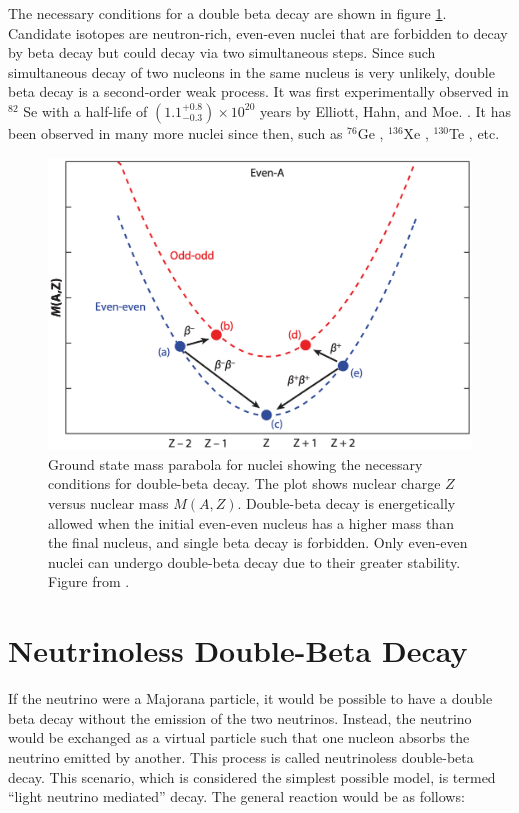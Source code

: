 

The necessary conditions for a double beta decay are shown in figure \ref{2nbb_cond}. Candidate isotopes are neutron-rich, even-even nuclei that are forbidden to decay by beta decay but could decay via two simultaneous steps. Since such simultaneous decay of two nucleons in the same nucleus is very unlikely, double beta decay is a second-order weak process. It was first experimentally observed in $^{82}$ Se with a half-life of $(1.1^{+0.8}_{-0.3})\times 10^{20}$ years by Elliott, Hahn, and Moe. \cite{PhysRevLett.59.2020}. It has been observed in many more nuclei since then, such as $^{76}$Ge \cite{PhysRevLett.125.252502}, $^{136}$Xe \cite{PhysRevLett.107.212501}, $^{130}$Te \cite{Alduino2017}, etc.

\clearpage
\begin{figure}[!htb]
\centering
\includegraphics[width=0.85\linewidth]{ch1/figs/2nbb_cond.png}
\caption{Ground state mass parabola for nuclei showing the necessary conditions for double-beta decay. The plot shows nuclear charge $Z$ versus nuclear mass $M(A,Z)$. Double-beta decay is energetically allowed when the initial even-even nucleus has a higher mass than the final nucleus, and single beta decay is forbidden. Only even-even nuclei can undergo double-beta decay due to their greater stability. Figure from \cite{2nbb_cond}.}
\label{2nbb_cond}
\end{figure}

\section{Neutrinoless Double-Beta Decay}
If the neutrino were a Majorana particle, it would be possible to have a double beta decay without the emission of the two neutrinos. Instead, the neutrino would be exchanged as a virtual particle such that one nucleon absorbs the neutrino emitted by another. This process is called neutrinoless double-beta decay. This scenario, which is considered the simplest possible model, is termed ``light neutrino mediated'' decay. The general reaction would be as follows:

